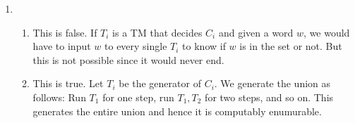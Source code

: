 \documentclass[12pt, letter paper]{article}
\author{To, Jean-Francois}
\begin{document}
\begin{enumerate}[label=\textbf{Question \arabic*},align=left]
	\item ~\\
		\begin{enumerate}
			\item 
				This is false. If $T_i$ is a TM that decides  $C_i$ and given a word
				$w$, we would have to input  $w$ to every single $T_i$ to know if $w$ is
				in the set or not. But this is not possible since it would never end.
			\item 
				This is true. Let $T_i$ be the generator of  $C_i$. We generate the
				union as follows: Run $ T_1$ for one step, run $ T_1,T_2$ for two steps,
				and so on. This generates the entire union and hence it is computably
				enumurable.
		\end{enumerate}
\end{enumerate}
\end{document}
